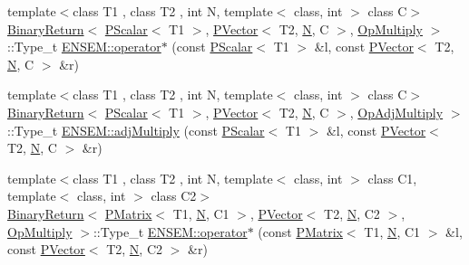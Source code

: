 \begin{DoxyCompactItemize}
\item 
{\footnotesize template$<$class T1 , class T2 , int N, template$<$ class, int $>$ class C$>$ }\\\mbox{\hyperlink{structENSEM_1_1BinaryReturn}{Binary\+Return}}$<$ \mbox{\hyperlink{classENSEM_1_1PScalar}{P\+Scalar}}$<$ T1 $>$, \mbox{\hyperlink{classENSEM_1_1PVector}{P\+Vector}}$<$ T2, \mbox{\hyperlink{operator__name__util_8cc_a7722c8ecbb62d99aee7ce68b1752f337}{N}}, C $>$, \mbox{\hyperlink{structENSEM_1_1OpMultiply}{Op\+Multiply}} $>$\+::Type\+\_\+t \mbox{\hyperlink{group__primvector_ga8312ce5cc507ffa0b4b203b976d05f47}{E\+N\+S\+E\+M\+::operator$\ast$}} (const \mbox{\hyperlink{classENSEM_1_1PScalar}{P\+Scalar}}$<$ T1 $>$ \&l, const \mbox{\hyperlink{classENSEM_1_1PVector}{P\+Vector}}$<$ T2, \mbox{\hyperlink{operator__name__util_8cc_a7722c8ecbb62d99aee7ce68b1752f337}{N}}, C $>$ \&r)
\item 
{\footnotesize template$<$class T1 , class T2 , int N, template$<$ class, int $>$ class C$>$ }\\\mbox{\hyperlink{structENSEM_1_1BinaryReturn}{Binary\+Return}}$<$ \mbox{\hyperlink{classENSEM_1_1PScalar}{P\+Scalar}}$<$ T1 $>$, \mbox{\hyperlink{classENSEM_1_1PVector}{P\+Vector}}$<$ T2, \mbox{\hyperlink{operator__name__util_8cc_a7722c8ecbb62d99aee7ce68b1752f337}{N}}, C $>$, \mbox{\hyperlink{structENSEM_1_1OpAdjMultiply}{Op\+Adj\+Multiply}} $>$\+::Type\+\_\+t \mbox{\hyperlink{group__primvector_ga8b4f68b7aa172234ddbd8490f45bb13c}{E\+N\+S\+E\+M\+::adj\+Multiply}} (const \mbox{\hyperlink{classENSEM_1_1PScalar}{P\+Scalar}}$<$ T1 $>$ \&l, const \mbox{\hyperlink{classENSEM_1_1PVector}{P\+Vector}}$<$ T2, \mbox{\hyperlink{operator__name__util_8cc_a7722c8ecbb62d99aee7ce68b1752f337}{N}}, C $>$ \&r)
\item 
{\footnotesize template$<$class T1 , class T2 , int N, template$<$ class, int $>$ class C1, template$<$ class, int $>$ class C2$>$ }\\\mbox{\hyperlink{structENSEM_1_1BinaryReturn}{Binary\+Return}}$<$ \mbox{\hyperlink{classENSEM_1_1PMatrix}{P\+Matrix}}$<$ T1, \mbox{\hyperlink{operator__name__util_8cc_a7722c8ecbb62d99aee7ce68b1752f337}{N}}, C1 $>$, \mbox{\hyperlink{classENSEM_1_1PVector}{P\+Vector}}$<$ T2, \mbox{\hyperlink{operator__name__util_8cc_a7722c8ecbb62d99aee7ce68b1752f337}{N}}, C2 $>$, \mbox{\hyperlink{structENSEM_1_1OpMultiply}{Op\+Multiply}} $>$\+::Type\+\_\+t \mbox{\hyperlink{group__primvector_gabc873d4c0d9c1d0ff8638e1674f29a72}{E\+N\+S\+E\+M\+::operator$\ast$}} (const \mbox{\hyperlink{classENSEM_1_1PMatrix}{P\+Matrix}}$<$ T1, \mbox{\hyperlink{operator__name__util_8cc_a7722c8ecbb62d99aee7ce68b1752f337}{N}}, C1 $>$ \&l, const \mbox{\hyperlink{classENSEM_1_1PVector}{P\+Vector}}$<$ T2, \mbox{\hyperlink{operator__name__util_8cc_a7722c8ecbb62d99aee7ce68b1752f337}{N}}, C2 $>$ \&r)

\end{DoxyCompactItemize}
